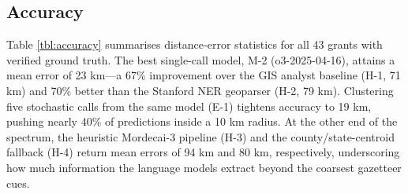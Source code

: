 \subsection{Accuracy}\label{accuracy}

Table \ref{tbl:accuracy} summarises distance‐error statistics for all 43
grants with verified ground truth. The best single-call model, M-2
(o3-2025-04-16), attains a mean error of 23 km---a 67\% improvement over
the GIS analyst baseline (H-1, 71 km) and 70\% better than the Stanford
NER geoparser (H-2, 79 km). Clustering five stochastic calls from the
same model (E-1) tightens accuracy to 19 km, pushing nearly 40\% of
predictions inside a 10 km radius. At the other end of the spectrum, the
heuristic Mordecai-3 pipeline (H-3) and the county/state-centroid
fallback (H-4) return mean errors of 94 km and 80 km, respectively,
underscoring how much information the language models extract beyond the
coarsest gazetteer cues.

